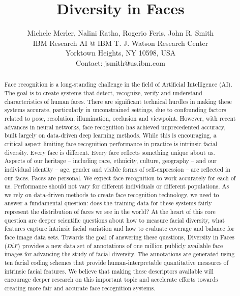 \documentclass[letterpaper,11pt]{article}
\begin{document}
\title{Diversity in Faces}
\author{Michele Merler, Nalini Ratha, Rogerio Feris, John R. Smith\\IBM Research AI @ IBM T. J. Watson Research Center\\Yorktown Heights, NY 10598, USA\\Contact: jsmith@us.ibm.com}
\maketitle

\begin{abstract}
Face recognition is a long-standing challenge in the field of Artificial Intelligence (AI).  The goal is to create systems that detect, recognize, verify and understand characteristics of human faces.  There are significant technical hurdles in making these systems accurate, particularly in unconstrained settings, due to confounding factors related to pose, resolution, illumination, occlusion and viewpoint.  However, with recent advances in neural networks, face recognition has achieved unprecedented accuracy, built largely on data-driven deep learning methods.  While this is encouraging, a critical aspect limiting face recognition performance in practice is intrinsic facial diversity.  Every face is different.  Every face reflects something unique about us.  Aspects of our heritage -- including race, ethnicity, culture, geography -- and our individual identity -- age, gender and visible forms of self-expression -- are reflected in our faces.  Faces are personal.  We expect face recognition to work accurately for each of us.  Performance should not vary for different individuals or different populations.  As we rely on data-driven methods to create face recognition technology, we need to answer a fundamental question: does the training data for these systems fairly represent the distribution of faces we see in the world?  At the heart of this core question are deeper scientific questions about how to measure facial diversity, what features capture intrinsic facial variation and how to evaluate coverage and balance for face image data sets.  Towards the goal of answering these questions, Diversity in Faces ($DiF$) provides a new data set of annotations of one million publicly available face images for advancing the study of facial diversity.  The annotations are generated using ten facial coding schemes that provide human-interpretable quantitative measures of intrinsic facial features.  We believe that making these descriptors available will encourage deeper research on this important topic and accelerate efforts towards creating more fair and accurate face recognition systems. 

\end{abstract}
\end{document}

